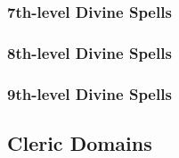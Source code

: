 \subsubsection{7th-level Divine Spells}
\begin{spelllist}
    \SLantimagicfield
    \SLantilifeshell
    \SLcureseriouswoundsmass
    \SLdeathwardmass
    \SLdestruction
    \SLdictum
    \SLholyword
    \SLinflictseriouswoundsmass
    \SLregeneration
    \SLsummonmonstervii
    \SLtrueseeing
\end{spelllist}

\subsubsection{8th-level Divine Spells}
\begin{spelllist}
    \SLcloakofchaos
    \SLcurecriticalwoundsmass
    \SLearthquake
    \SLenervationgreater
    \SLholyaura
    \SLinflictcriticalwoundsmass
    \SLshieldoflaw
    \SLsummonmonsterviii
    \SLunholyaura
\end{spelllist}

\subsubsection{9th-level Divine Spells}
\begin{spelllist}
    \SLimplosion
    \SLstormofvengeance
    \SLsummonmonsterix
\end{spelllist}

\subsection{Cleric Domains}\label{Cleric Domains}

\begin{comment}
\subsubsection{Example Domain}
\parhead{Domain Power}
\parhead{Channelled Domain Power}
\parhead[Greate] Domain Power}
\parhead[Greate] Channelled Domain Power}
\parhead{Domain Mastery}
\begin{spelllist}
    \spellhead[1]{}
    \spellhead[1]{}
    \spellhead[2]{}
    \spellhead[2]{}
    \spellhead[3]{}
    \spellhead[3]{}
    \spellhead[4]{}
    \spellhead[4]{}
    \spellhead[5]{}
    \spellhead[5]{}
    \spellhead[6]{}
    \spellhead[6]{}
    \spellhead[7]{}
    \spellhead[7]{}
    \spellhead[8]{}
    \spellhead[8]{}
    \spellhead[9]{}
    \spellhead[9]{}
\end{spelllist}
\end{comment}

